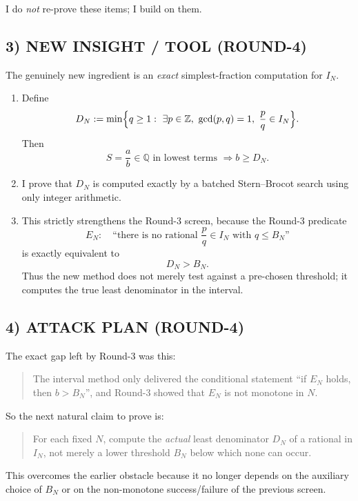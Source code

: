 I do \emph{not} re-prove these items; I build on them.

\subsection*{3) NEW INSIGHT / TOOL (ROUND-4)}

The genuinely new ingredient is an \emph{exact} simplest-fraction computation for $I_N$.

\begin{enumerate}
\item Define
\[
D_N:=\min\Bigl\{q\ge 1:\ \exists p\in\mathbb Z,\ \gcd(p,q)=1,\ \frac pq\in I_N\Bigr\}.
\]
Then
\[
S=\frac ab\in\mathbb Q \text{ in lowest terms } \Longrightarrow b\ge D_N.
\]

\item I prove that $D_N$ is computed exactly by a batched Stern--Brocot search using only integer arithmetic.

\item This strictly strengthens the Round-3 screen, because the Round-3 predicate
\[
E_N:\quad \text{``there is no rational } \frac pq\in I_N \text{ with } q\le B_N\text{''}
\]
is exactly equivalent to
\[
D_N>B_N.
\]
Thus the new method does not merely test against a pre-chosen threshold; it computes the true least denominator in the interval.
\end{enumerate}

\subsection*{4) ATTACK PLAN (ROUND-4)}

The exact gap left by Round-3 was this:

\begin{quote}
The interval method only delivered the conditional statement ``if $E_N$ holds, then $b>B_N$'', and Round-3 showed that $E_N$ is not monotone in $N$.
\end{quote}

So the next natural claim to prove is:

\begin{quote}
For each fixed $N$, compute the \emph{actual} least denominator $D_N$ of a rational in $I_N$, not merely a lower threshold $B_N$ below which none can occur.
\end{quote}

This overcomes the earlier obstacle because it no longer depends on the auxiliary choice of $B_N$ or on the non-monotone success/failure of the previous screen.


